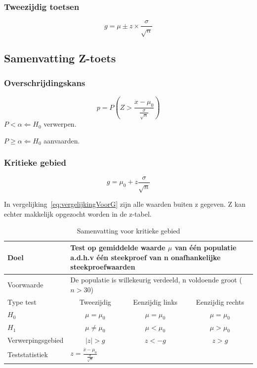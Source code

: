 \documentclass[a4paper,12pt]{article}
\begin{document}
\subsubsection{Tweezijdig toetsen}
\begin{equation}
g=\mu \pm z \times \frac{\sigma}{\sqrt{n}}
\end{equation}

\subsection{Samenvatting Z-toets}
\subsubsection{Overschrijdingskans}
\begin{equation}
p=P(Z>\frac{x-\mu_0}{\frac{\sigma}{\sqrt{n}}})
\end{equation}
$P<\alpha \Leftarrow H_0 $ verwerpen.

$P\geq \alpha \Leftarrow H_0$ aanvaarden.
\subsubsection{Kritieke gebied}
\begin{equation}
g=\mu_0 + z\frac{\sigma}{\sqrt{n}}
\label{eq:vergelijkingVoorG}
\end{equation}

In vergelijking~\ref{eq:vergelijkingVoorG} zijn alle waarden buiten z gegeven. Z kan echter makkelijk opgezocht worden in de z-tabel.

\begin{table}[H]
\centering
\begin{tabular}{l c c c}
Doel & \multicolumn{3}{l}{
\begin{minipage}{11cm}
Test op gemiddelde waarde $\mu$ van één populatie a.d.h.v één steekproef van n onafhankelijke steekproefwaarden
\end{minipage}
}\\
\hline
Voorwaarde & \multicolumn{3}{l}{De populatie is willekeurig verdeeld, n voldoende groot ($n>30$)}\\
\hline
Type test & Tweezijdig & Eenzijdig links & Eenzijdig rechts\\
\hline
$H_0$ & $\mu = \mu_0$ & $\mu = \mu_0$ & $\mu = \mu_0$\\
$H_1$ & $\mu \neq \mu_0$ & $\mu < \mu_0$ & $\mu >\mu_0$ \\
Verwerpingsgebied & $|z| > g $ & $z<-g$ & $z>g$\\
Teststatistiek & \multicolumn{3}{l}{$z=\frac{\overline{x}-\mu_0}{\frac{\sigma}{\sqrt{n}}}$} \\
\hline
\end{tabular}
\caption{Samenvatting  voor kritieke gebied}
\label{tab:kritiekeGebied}
\end{table}
\end{document}
